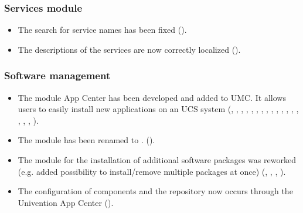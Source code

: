 \subsubsection{Services module}
\begin{itemize}
\item The search for service names has been fixed ().
\item The descriptions of the services are now correctly localized
  ().
\end{itemize}


\subsubsection{Software management}
\begin{itemize}
\item The module App Center has been developed and added to UMC. It allows
  users to easily install new applications on an UCS system
  (, , , ,
  , ,  , ,
  , , , ,
  , , , ,
  , ).

\item The 
  module has been renamed to
  .
  ().

\item The module for the installation of additional software packages
  was reworked (e.g. added possibility to install/remove multiple
  packages at once) (, , , ).

\item The configuration of components and the repository now occurs
  through the Univention App Center ().
\end{itemize}

